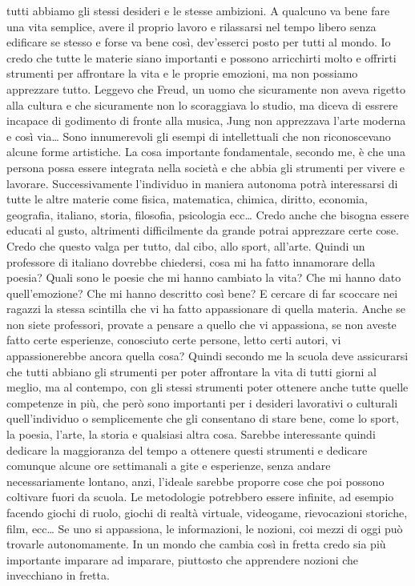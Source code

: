 \documentclass[12pt]{book} %
\begin{document}
tutti abbiamo gli stessi desideri e le stesse ambizioni. A qualcuno va bene fare una vita semplice, avere il proprio
lavoro e rilassarsi nel tempo libero senza edificare se stesso e forse va bene così, dev'esserci
posto per tutti al mondo. Io credo che tutte le materie siano importanti e possono arricchirti molto e offrirti
strumenti per affrontare la vita e le proprie emozioni, ma non possiamo apprezzare tutto. Leggevo che Freud, un uomo
che sicuramente non aveva rigetto alla cultura e che sicuramente non lo scoraggiava lo studio, ma diceva di essrere
incapace di godimento di fronte alla musica, Jung non apprezzava l'arte moderna e così via… Sono
innumerevoli gli esempi di intellettuali che non riconoscevano alcune forme artistiche. La cosa importante
fondamentale, secondo me, è che una persona possa essere integrata nella società e che abbia gli strumenti per vivere e
lavorare. Successivamente l'individuo in maniera autonoma potrà interessarsi di tutte le altre
materie come fisica, matematica, chimica, diritto, economia, geografia, italiano, storia, filosofia, psicologia ecc…
Credo anche che bisogna essere educati al gusto, altrimenti difficilmente da grande potrai apprezzare certe cose. Credo
che questo valga per tutto, dal cibo, allo sport, all'arte. Quindi un professore di italiano
dovrebbe chiedersi, cosa mi ha fatto innamorare della poesia? Quali sono le poesie che mi hanno cambiato la vita? Che
mi hanno dato quell'emozione? Che mi hanno descritto così bene? E cercare di far scoccare nei
ragazzi la stessa scintilla che vi ha fatto appassionare di quella materia. Anche se non siete professori, provate a
pensare a quello che vi appassiona, se non aveste fatto certe esperienze, conosciuto certe persone, letto certi autori,
vi appassionerebbe ancora quella cosa? Quindi secondo me la scuola deve assicurarsi che tutti abbiano gli strumenti per
poter affrontare la vita di tutti giorni al meglio, ma al contempo, con gli stessi strumenti poter ottenere anche tutte
quelle competenze in più, che però sono importanti per i desideri lavorativi o culturali
quell'individuo o semplicemente che gli consentano di stare bene, come lo sport, la poesia,
l'arte, la storia e qualsiasi altra cosa. Sarebbe interessante quindi dedicare la maggioranza del
tempo a ottenere questi strumenti e dedicare comunque alcune ore settimanali a gite e esperienze, senza andare
necessariamente lontano, anzi, l'ideale sarebbe proporre cose che poi possono coltivare fuori da
scuola. Le metodologie potrebbero essere infinite, ad esempio facendo giochi di ruolo, giochi di realtà virtuale,
videogame, rievocazioni storiche, film, ecc… Se uno si appassiona, le informazioni, le nozioni, coi mezzi di oggi può
trovarle autonomamente. In un mondo che cambia così in fretta credo sia più importante imparare ad imparare, piuttosto
che apprendere nozioni che invecchiano in fretta.
\end{document}
